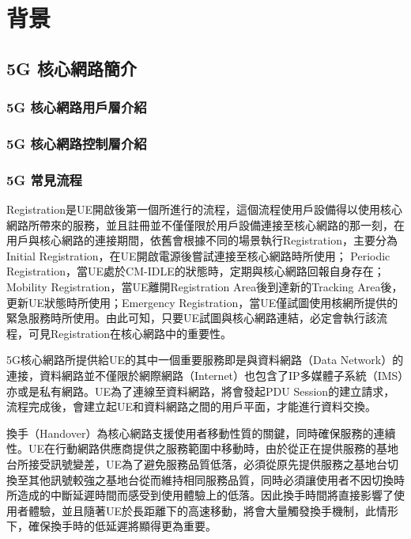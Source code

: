 \chapter{背景}
\label{chapter:background}


\section{5G 核心網路簡介}
\label{sec:5g_core_intro}


\subsection{5G 核心網路用戶層介紹}
\label{subsec:5g_up_intro}


\subsection{5G 核心網路控制層介紹}
\label{subsec:5g_cp_intro}


\subsection{5G 常見流程}
\label{subsec:5g_procedure}

Registration是UE開啟後第一個所進行的流程，這個流程使用戶設備得以使用核心網路所帶來的服務，並且註冊並不僅僅限於用戶設備連接至核心網路的那一刻，在用戶與核心網路的連接期間，依舊會根據不同的場景執行Registration，主要分為Initial Registration，在UE開啟電源後嘗試連接至核心網路時所使用；
Periodic Registration，當UE處於CM-IDLE的狀態時，定期與核心網路回報自身存在；Mobility Registration，當UE離開Registration Area後到達新的Tracking Area後，更新UE狀態時所使用；Emergency Registration，當UE僅試圖使用核網所提供的緊急服務時所使用。由此可知，只要UE試圖與核心網路連結，必定會執行該流程，可見Registration在核心網路中的重要性。

        5G核心網路所提供給UE的其中一個重要服務即是與資料網路（Data Network）的連接，資料網路並不僅限於網際網路（Internet）也包含了IP多媒體子系統（IMS）亦或是私有網路。UE為了連線至資料網路，將會發起PDU Session的建立請求，流程完成後，會建立起UE和資料網路之間的用戶平面，才能進行資料交換。
        
      換手（Handover）為核心網路支援使用者移動性質的關鍵，同時確保服務的連續性。UE在行動網路供應商提供之服務範圍中移動時，由於從正在提供服務的基地台所接受訊號變差，UE為了避免服務品質低落，必須從原先提供服務之基地台切換至其他訊號較強之基地台從而維持相同服務品質，同時必須讓使用者不因切換時所造成的中斷延遲時間而感受到使用體驗上的低落。因此換手時間將直接影響了使用者體驗，並且隨著UE於長距離下的高速移動，將會大量觸發換手機制，此情形下，確保換手時的低延遲將顯得更為重要。
      
